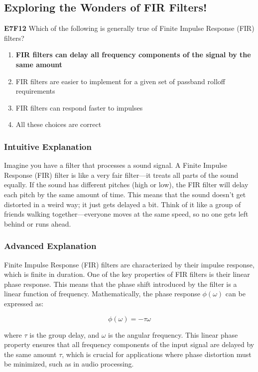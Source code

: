 \subsection{Exploring the Wonders of FIR Filters!}
\label{sec:E7F12}

\begin{tcolorbox}[colback=blue!5!white,colframe=blue!75!black,title=E7F12]
\textbf{E7F12} Which of the following is generally true of Finite Impulse Response (FIR) filters?
\begin{enumerate}[label=\Alph*.]
    \item \textbf{FIR filters can delay all frequency components of the signal by the same amount}
    \item FIR filters are easier to implement for a given set of passband rolloff requirements
    \item FIR filters can respond faster to impulses
    \item All these choices are correct
\end{enumerate}
\end{tcolorbox}

\subsubsection{Intuitive Explanation}
Imagine you have a filter that processes a sound signal. A Finite Impulse Response (FIR) filter is like a very fair filter—it treats all parts of the sound equally. If the sound has different pitches (high or low), the FIR filter will delay each pitch by the same amount of time. This means that the sound doesn’t get distorted in a weird way; it just gets delayed a bit. Think of it like a group of friends walking together—everyone moves at the same speed, so no one gets left behind or runs ahead.

\subsubsection{Advanced Explanation}
Finite Impulse Response (FIR) filters are characterized by their impulse response, which is finite in duration. One of the key properties of FIR filters is their linear phase response. This means that the phase shift introduced by the filter is a linear function of frequency. Mathematically, the phase response \(\phi(\omega)\) can be expressed as:

\[
\phi(\omega) = -\tau \omega
\]

where \(\tau\) is the group delay, and \(\omega\) is the angular frequency. This linear phase property ensures that all frequency components of the input signal are delayed by the same amount \(\tau\), which is crucial for applications where phase distortion must be minimized, such as in audio processing.

